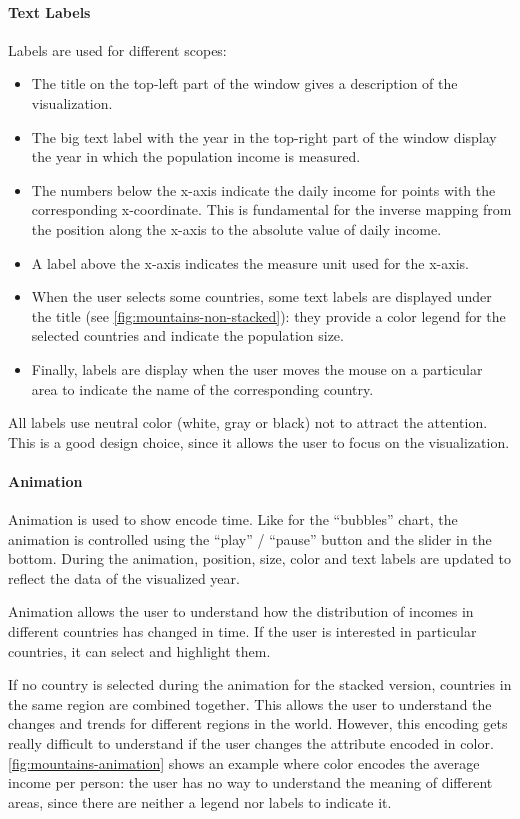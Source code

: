\paragraph{Text Labels}
Labels are used for different scopes:
\begin{itemize}
	\item The title on the top-left part of the window gives a description of the visualization.
	\item The big text label with the year in the top-right part of the window display the year in which the population income is measured.
	\item The numbers below the x-axis indicate the daily income for points with the corresponding x-coordinate. This is fundamental for the inverse mapping from the position along the x-axis to the absolute value of daily income.
	\item A label above the x-axis indicates the measure unit used for the x-axis.
	\item When the user selects some countries, some text labels are displayed under the title (see \cref{fig:mountains-non-stacked}): they provide a color legend for the selected countries and indicate the population size.
	\item Finally, labels are display when the user moves the mouse on a particular area to indicate the name of the corresponding country.
\end{itemize}
All labels use neutral color (white, gray or black) not to attract the attention.
This is a good design choice, since it allows the user to focus on the visualization.

\paragraph{Animation}
Animation is used to show encode time.
Like for the ``bubbles'' chart, the animation is controlled using the ``play'' / ``pause'' button and the slider in the bottom.
During the animation, position, size, color and text labels are updated to reflect the data of the visualized year.

Animation allows the user to understand how the distribution of incomes in different countries has changed in time.
If the user is interested in particular countries, it can select and highlight them.

If no country is selected during the animation for the stacked version, countries in the same region are combined together.
This allows the user to understand the changes and trends for different regions in the world.
However, this encoding gets really difficult to understand if the user changes the attribute encoded in color.
\cref{fig:mountains-animation} shows an example where color encodes the average income per person:
the user has no way to understand the meaning of different areas, since there are neither a legend nor labels to indicate it.

